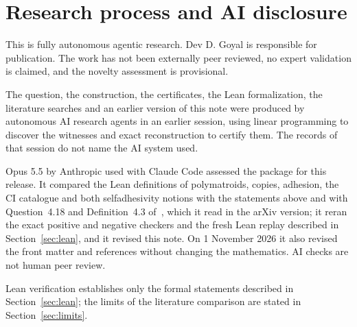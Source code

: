 \documentclass[11pt]{article}
\begin{document}
\section{Research process and AI disclosure}\label{sec:disclosure}
This is fully autonomous agentic research. Dev D. Goyal is responsible for
publication. The work has not been externally peer reviewed, no expert
validation is claimed, and the novelty assessment is provisional.

The question, the construction, the certificates, the Lean formalization, the
literature searches and an earlier version of this note were produced by
autonomous AI research agents in an earlier session, using linear programming
to discover the witnesses and exact reconstruction to certify them. The records
of that session do not name the AI system used.

Opus 5.5 by Anthropic used with Claude Code assessed the package for this
release. It compared the Lean definitions of polymatroids, copies, adhesion,
the CI catalogue and both selfadhesivity notions with the statements above and
with Question~4.18 and Definition~4.3 of~\cite{Boege}, which it read in the
arXiv version; it reran the exact positive and negative checkers and the fresh
Lean replay described in Section~\ref{sec:lean}, and it revised this note. On
1 November 2026 it also revised the front matter and references without
changing the mathematics. AI checks are not human peer review.

Lean verification establishes only the formal statements described in
Section~\ref{sec:lean}; the limits of the literature comparison are stated in
Section~\ref{sec:limits}.

\appendix
\end{document}
